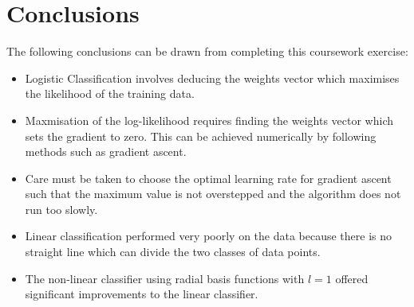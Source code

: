 \documentclass[twocolumn]{article}
\begin{document}
\section{Conclusions}
The following conclusions can be drawn from completing this coursework exercise:
\begin{itemize}
	\item Logistic Classification involves deducing the weights vector which maximises the likelihood of the training data.
	\item Maxmisation of the log-likelihood requires finding the weights vector which sets the gradient to zero. This can be achieved numerically by following methods such as gradient ascent.
	\item Care must be taken to choose the optimal learning rate for gradient ascent such that the maximum value is not overstepped and the algorithm does not run too slowly.
	\item Linear classification performed very poorly on the data because there is no straight line which can divide the two classes of data points.
	\item The non-linear classifier using radial basis functions with $l=1$ offered significant improvements to the linear classifier.
\end{itemize}
\end{document}
